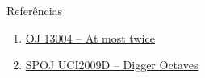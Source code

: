 \begin{frame}[fragile]{Referências}

    \begin{enumerate}
        \item \href{https://onlinejudge.org/index.php?option=com_onlinejudge&Itemid=8&category=24&page=show_problem&problem=4892}{OJ 13004 -- At most twice} 
 
        \item \href{https://www.spoj.com/problems/UCI2009D/}{SPOJ UCI2009D -- Digger Octaves}
 
    \end{enumerate}

\end{frame}
